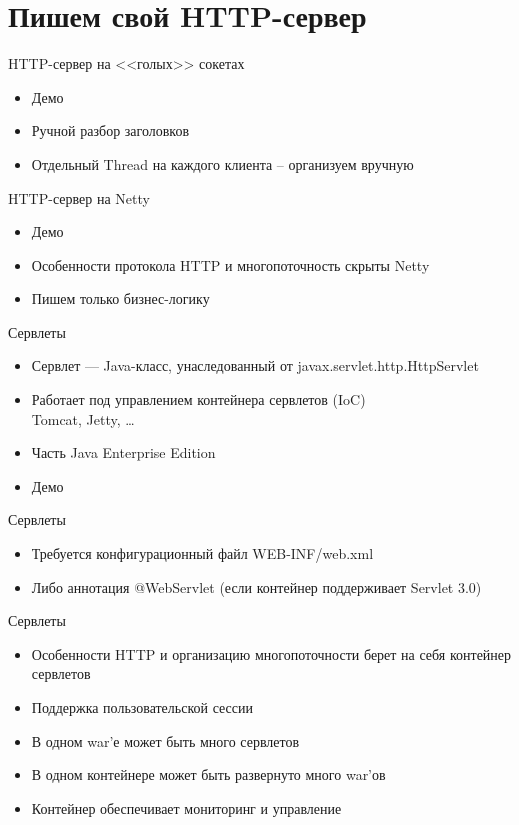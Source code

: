 \documentclass[unicode]{beamer}
\begin{document}
\section{Пишем свой HTTP-сервер}

\begin{frame}{HTTP-сервер на <<голых>> сокетах}
\begin{itemize}
\item Демо
\bigskip
\item Ручной разбор заголовков
\item Отдельный Thread на каждого клиента – организуем вручную
\end{itemize}
\end{frame}


\begin{frame}{HTTP-сервер на Netty}
\begin{itemize}
\item Демо
\bigskip
\item Особенности протокола HTTP и многопоточность скрыты Netty
\item Пишем только бизнес-логику
\end{itemize}
\end{frame}


\begin{frame}{Сервлеты}
\begin{itemize}
\item Сервлет --- Java-класс, унаследованный от javax.servlet.http.HttpServlet
\bigskip
\item Работает под управлением контейнера сервлетов (IoC)\\
Tomcat, Jetty, \ldots
\bigskip
\item Часть Java Enterprise Edition
\bigskip
\item Демо
\end{itemize}
\end{frame}


\begin{frame}{Сервлеты}
\begin{itemize}
\item Требуется конфигурационный файл WEB-INF/web.xml
\item Либо аннотация @WebServlet (если контейнер поддерживает Servlet 3.0)
\end{itemize}
\end{frame}


\begin{frame}{Сервлеты}
\begin{itemize}
\item Особенности HTTP и организацию многопоточности берет на себя контейнер сервлетов
\item Поддержка пользовательской сессии
\bigskip
\item В одном war’е может быть много сервлетов
\item В одном контейнере может быть развернуто много war’ов
\item Контейнер обеспечивает мониторинг и управление
\end{itemize}
\end{frame}
\end{document}
